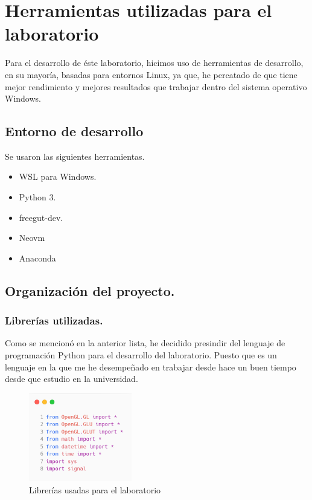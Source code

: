 \chapter{Herramientas utilizadas para el laboratorio} \label{chap:herramientas}
Para el desarrollo de éste laboratorio, hicimos uso de herramientas de desarrollo, en su mayoría, basadas para entornos Linux, ya que, he percatado de que tiene mejor rendimiento y mejores resultados que trabajar dentro del sistema operativo Windows.

\section{Entorno de desarrollo}
Se usaron las siguientes herramientas.

\begin{itemize}
\item WSL para Windows.
\item Python 3.
\item freegut-dev.
\item Neovm
\item Anaconda
\end{itemize}

\section{Organización del proyecto.}
\subsection{Librerías utilizadas.}
Como se mencionó en la anterior lista, he decidido presindir del lenguaje de programación Python para el desarrollo del laboratorio. Puesto que es un lenguaje en la que me he desempeñado en trabajar desde hace un buen tiempo desde que estudio en la universidad.

\begin{figure}[H]
\centering
\includegraphics[width=0.4\textwidth]{../img/chapter01/1.png}
\caption{Librerías usadas para el laboratorio}
\label{fig:librerias_py}
\end{figure}


